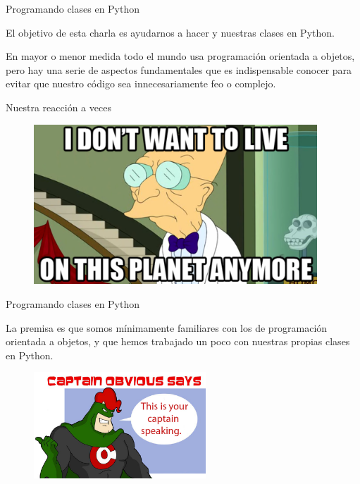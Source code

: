 \begin{frame}{Programando clases en Python}
  \begin{block}{}
    \Large
    \centering
    El objetivo de esta charla es ayudarnos a hacer
     y  nuestras clases en
    Python.
  \end{block}

  \begin{justify}
    En mayor o menor medida todo el mundo usa programación orientada a
    objetos, pero hay una serie de aspectos fundamentales que es
    indispensable conocer para evitar que nuestro código sea
    innecesariamente feo o complejo.
  \end{justify}
\end{frame}

\begin{frame}{Nuestra reacción a veces}
  \begin{figure}
    \centering
    \includegraphics[height=6cm]{pics/dont-want-to-live-on-this-planet.png}
  \end{figure}
\end{frame}

\begin{frame}{Programando clases en Python}
  \begin{alertblock}{}
    \small
    \centering
    La premisa es que somos mínimamente familiares con los
     de programación orientada a objetos,
    y que hemos trabajado un poco con nuestras propias clases en
    Python.
  \end{alertblock}

  \begin{figure}
    \centering
    \includegraphics[height=4cm]{pics/captain-obvious.jpg}
  \end{figure}
\end{frame}

